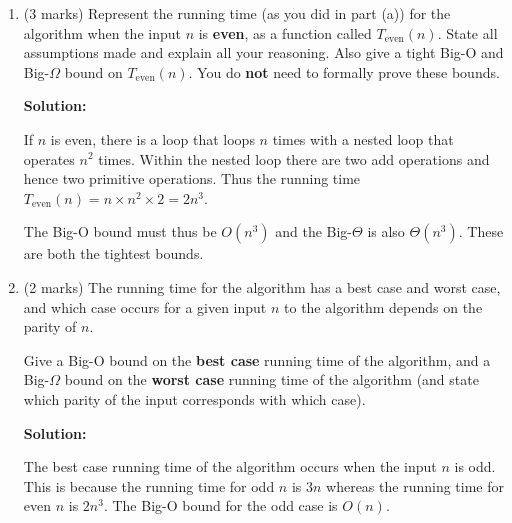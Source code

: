 \documentclass[a4,13pt]{extarticle}
\newenvironment{Solution}{\color{blue}\textbf{Solution:}}{}
\begin{document}
\begin{enumerate}
\begin{enumerate}
\begin{Solution}
				Since the Big-O and Big-$\Theta$ bounds are both $n$, the constants $c_1 = c_2 = 3$ and $n_0 = 1$ can be used. This would result in $c_1g(n) = c_2g(n) = 3n$ which is also equal to $f(n)$ for all $n \geq 1$. Thus the above definition is satisfied and the Big-$\Theta$ bound must be $\Theta(n)$. 
	      	\end{Solution}
								  
			\medskip
	      	      	      	                  
	      	\item (3 marks) Represent the running time (as you did in part (a)) for the algorithm when the input $n$ is \textbf{even}, as a function called $T_{\text{even}}(n)$. State all assumptions made and explain all your reasoning. Also give a tight Big-O and Big-$\Omega$ bound on $T_{\text{even}}(n)$. You do \textbf{not} need to formally prove these bounds.
	      	
			\begin{Solution}
			
				If $n$ is even, there is a loop that loops $n$ times with a nested loop that operates $n^2$ times. Within the nested loop there are two add operations and hence two primitive operations. Thus the running time $T_{\text{even}}(n) = n \times n^2 \times 2 = 2n^3$.

				\medskip

				The Big-O bound must thus be $O(n^3)$ and the Big-$\Theta$ is also $\Theta(n^3)$. These are both the tightest bounds.
			\end{Solution}
			\medskip
	      	      	      	                  
	      	\item (2 marks) The running time for the algorithm has a best case and worst case, and which case occurs for a given input $n$ to the algorithm depends on the parity of $n$.
	      	      	      	                  
			Give a Big-O bound on the \textbf{best case} running time of the algorithm, and a Big-$\Omega$ bound on the \textbf{worst case} running time of the algorithm (and state which parity of the input corresponds with which case).

			\begin{Solution}
				
				The best case running time of the algorithm occurs when the input $n$ is odd. This is because the running time for odd $n$ is $3n$ whereas the running time for even $n$ is $2n^3$. The Big-O bound for the odd case is $O(n)$.


\end{Solution}
\end{enumerate}
\end{enumerate}
\end{document}

